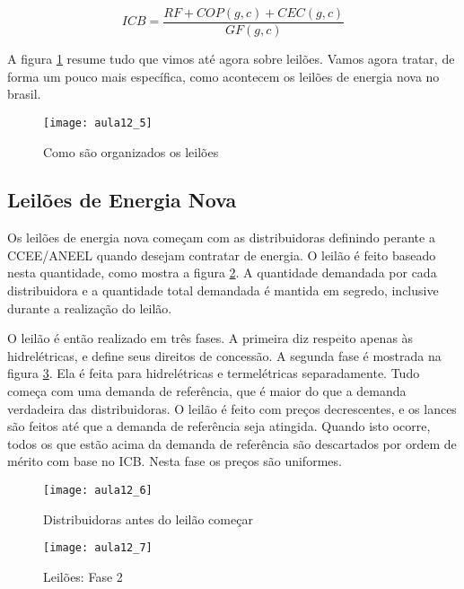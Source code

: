 \begin{equation}
\label{eq12-1}
ICB=\frac{RF+COP(g,c)+CEC(g,c)}{GF(g,c)}
\end{equation}

A figura \ref{fig:aula12_5} resume tudo que vimos até agora sobre leilões. Vamos agora tratar, de forma um pouco mais específica, como acontecem os leilões de energia nova no brasil. 

\begin{figure}[H]
\begin{centering}
\texttt{[image: aula12\_5]}\protect\caption{\label{fig:aula12_5} Como são organizados os leilões}
\end{centering}
\end{figure}

\subsection{Leilões de Energia Nova}

Os leilões de energia nova começam com as distribuidoras definindo perante a CCEE/ANEEL quando desejam contratar de energia. O leilão é feito baseado nesta quantidade, como mostra a figura \ref{fig:aula12_6}. A quantidade demandada por cada distribuidora e a quantidade total demandada é mantida em segredo, inclusive durante a realização do leilão. 

O leilão é então realizado em três fases. A primeira diz respeito apenas às hidrelétricas, e define seus direitos de concessão. A segunda fase é mostrada na figura \ref{fig:aula12_7}. Ela é feita para hidrelétricas e termelétricas separadamente. Tudo começa com uma demanda de referência, que é maior do que a demanda verdadeira das distribuidoras. O leilão é feito com preços decrescentes, e os lances são feitos até que a demanda de referência seja atingida. Quando isto ocorre, todos os que estão acima da demanda de referência são descartados por ordem de mérito com base no ICB. Nesta fase os preços são uniformes. 

\begin{figure}[H]
\begin{centering}
\texttt{[image: aula12\_6]}\protect\caption{\label{fig:aula12_6} Distribuidoras antes do leilão começar}
\end{centering}
\end{figure}

\begin{figure}[H]
\begin{centering}
\texttt{[image: aula12\_7]}\protect\caption{\label{fig:aula12_7} Leilões: Fase 2}
\end{centering}
\end{figure}

